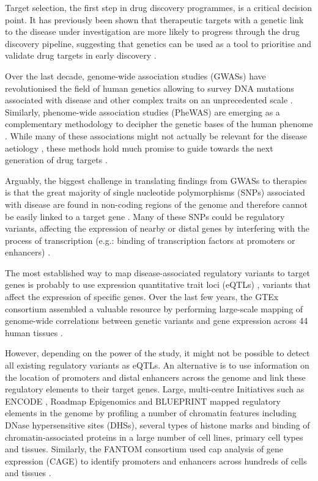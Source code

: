 \documentclass[9pt,a4paper,]{extarticle}
\begin{document}
Target selection, the first step in drug discovery programmes, is a critical decision point.
It has previously been shown that therapeutic targets with a genetic link to the disease under investigation are more likely to progress through the drug discovery pipeline, suggesting that genetics can be used as a tool to prioritise and validate drug targets in early discovery \citep{Plenge2013, Nelson2015}.

Over the last decade, genome-wide association studies (GWASs) have revolutionised the field of human genetics allowing to survey DNA mutations associated with disease and other complex traits on an unprecedented scale \citep{Visscher2017}.
Similarly, phenome-wide association studies (PheWAS) are emerging as a complementary methodology to decipher the genetic bases of the human phenome \citep{Bush2016}.
While many of these associations might not actually be relevant for the disease aetiology \citep{Boyle2017}, these methods hold much promise to guide towards the next generation of drug targets \citep{Finan2017}.

Arguably, the biggest challenge in translating findings from GWASs to therapies is that the great majority of single nucleotide polymorphisms (SNPs) associated with disease are found in non-coding regions of the genome and therefore cannot be easily linked to a target gene \citep{Maurano2012}.
Many of these SNPs could be regulatory variants, affecting the expression of nearby or distal genes by interfering with the process of transcription (e.g.: binding of transcription factors at promoters or enhancers) \citep{Ward2012}.

The most established way to map disease-associated regulatory variants to target genes is probably to use expression quantitative trait loci (eQTLs) \citep{Albert2015}, variants that affect the expression of specific genes.
Over the last few years, the GTEx consortium assembled a valuable resource by performing large-scale mapping of genome-wide correlations between genetic variants and gene expression across 44 human tissues \citep{GTEx2017a}.

However, depending on the power of the study, it might not be possible to detect all existing regulatory variants as eQTLs.
An alternative is to use information on the location of promoters and distal enhancers across the genome and link these regulatory elements to their target genes.
Large, multi-centre Initiatives such as ENCODE \citep{ENCODE2012}, Roadmap Epigenomics \citep{Roadmap2015} and BLUEPRINT \citep{Adams2012, Stunnenberg2016} mapped regulatory elements in the genome by profiling a number of chromatin features including DNase hypersensitive sites (DHSs), several types of histone marks and binding of chromatin-associated proteins in a large number of cell lines, primary cell types and tissues.
Similarly, the FANTOM consortium used cap analysis of gene expression (CAGE) to identify promoters and enhancers across hundreds of cells and tissues \citep{Fantom2014}.
\end{document}
